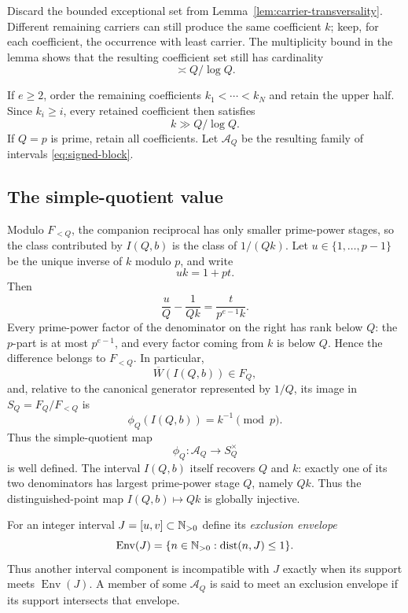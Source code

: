 Discard the bounded exceptional set from Lemma~\ref{lem:carrier-transversality}.  Different remaining carriers can still produce the same coefficient $k$; keep, for each coefficient, the occurrence with least carrier.  The multiplicity bound in the lemma shows that the resulting coefficient set still has cardinality
\[
\asymp Q/\log Q.
\]

If $e\ge2$, order the remaining coefficients $k_1<\cdots<k_N$ and retain the upper half.  Since $k_i\ge i$, every retained coefficient then satisfies
\begin{equation}\label{eq:coef-lower}
k\gg Q/\log Q.
\end{equation}
If $Q=p$ is prime, retain all coefficients.  Let $\mathcal A_Q$ be the resulting family of intervals \eqref{eq:signed-block}.

\subsection{The simple-quotient value}

Modulo $F_{<Q}$, the companion reciprocal has only smaller prime-power stages, so the class contributed by $I(Q,b)$ is the class of $1/(Qk)$.  Let $u\in\{1,\ldots,p-1\}$ be the unique inverse of $k$ modulo $p$, and write
\[
uk=1+pt.
\]
Then
\begin{equation}\label{eq:simple-coordinate-calculation}
\frac{u}{Q}-\frac1{Qk}
=\frac{t}{p^{e-1}k}.
\end{equation}
Every prime-power factor of the denominator on the right has rank below $Q$: the $p$-part is at most $p^{e-1}$, and every factor coming from $k$ is below $Q$.  Hence the difference belongs to $F_{<Q}$.  In particular,
\begin{equation}\label{eq:signed-label-filtration}
\overline W(I(Q,b))\in F_Q,
\end{equation}
and, relative to the canonical generator represented by $1/Q$, its image in $S_Q=F_Q/F_{<Q}$ is
\begin{equation}\label{eq:simple-value}
\phi_Q(I(Q,b))=k^{-1}\pmod p.
\end{equation}
Thus the simple-quotient map
\[
\phi_Q:\mathcal A_Q\longrightarrow S_Q^\times
\]
is well defined.  The interval $I(Q,b)$ itself recovers $Q$ and $k$: exactly one of its two denominators has largest prime-power stage $Q$, namely $Qk$.  Thus the distinguished-point map $I(Q,b)\mapsto Qk$ is globally injective.

For an integer interval $J=[u,v]\subset\mathbb N_{>0}$ define its \emph{exclusion envelope}
\[
\operatorname{Env}(J)
=\{n\in\mathbb N_{>0}:\operatorname{dist}(n,J)\le1\}.
\]
Thus another interval component is incompatible with $J$ exactly when its support meets $\operatorname{Env}(J)$.  A member of some $\mathcal A_Q$ is said to meet an exclusion envelope if its support intersects that envelope.

